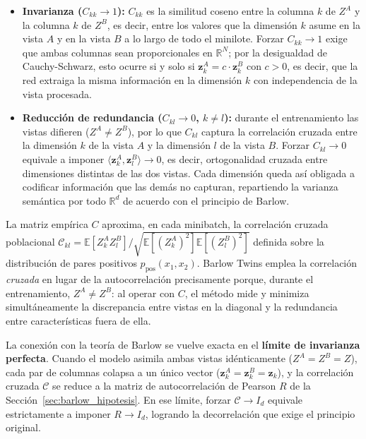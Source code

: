 \begin{itemize}
    \item \textbf{Invarianza ($C_{kk} \to 1$):} $C_{kk}$ es la similitud coseno entre la columna $k$ de $Z^A$ y la columna $k$ de $Z^B$, es decir, entre los valores que la dimensión $k$ asume en la vista $A$ y en la vista $B$ a lo largo de todo el minilote. Forzar $C_{kk} \to 1$ exige que ambas columnas sean proporcionales en $\mathbb{R}^N$; por la desigualdad de Cauchy-Schwarz, esto ocurre si y solo si $\mathbf{z}_k^A = c \cdot \mathbf{z}_k^B$ con $c > 0$, es decir, que la red extraiga la misma información en la dimensión $k$ con independencia de la vista procesada.

    \item \textbf{Reducción de redundancia ($C_{kl} \to 0$, $k \neq l$):} durante el entrenamiento las vistas difieren ($Z^A \neq Z^B$), por lo que $C_{kl}$ captura la correlación cruzada entre la dimensión $k$ de la vista $A$ y la dimensión $l$ de la vista $B$. Forzar $C_{kl} \to 0$ equivale a imponer $\langle \mathbf{z}_k^A, \mathbf{z}_l^B \rangle \to 0$, es decir, ortogonalidad cruzada entre dimensiones distintas de las dos vistas. Cada dimensión queda así obligada a codificar información que las demás no capturan, repartiendo la varianza semántica por todo $\mathbb{R}^d$ de acuerdo con el principio de Barlow.
\end{itemize}

La matriz empírica $C$ aproxima, en cada minibatch, la correlación cruzada poblacional $\mathcal{C}_{kl} = \mathbb{E}[Z_k^A Z_l^B] / \sqrt{\mathbb{E}[(Z_k^A)^2]\mathbb{E}[(Z_l^B)^2]}$ definida sobre la distribución de pares positivos $p_{\text{pos}}(x_1,x_2)$. Barlow Twins emplea la correlación \textit{cruzada} en lugar de la autocorrelación precisamente porque, durante el entrenamiento, $Z^A \neq Z^B$: al operar con $C$, el método mide y minimiza simultáneamente la discrepancia entre vistas en la diagonal y la redundancia entre características fuera de ella.

La conexión con la teoría de Barlow se vuelve exacta en el \textbf{límite de invarianza perfecta}. Cuando el modelo asimila ambas vistas idénticamente ($Z^A = Z^B = Z$), cada par de columnas colapsa a un único vector ($\mathbf{z}_k^A = \mathbf{z}_k^B = \mathbf{z}_k$), y la correlación cruzada $\mathcal{C}$ se reduce a la matriz de autocorrelación de Pearson $R$ de la Sección~\ref{sec:barlow_hipotesis}. En ese límite, forzar $\mathcal{C} \to I_d$ equivale estrictamente a imponer $R \to I_d$, logrando la decorrelación que exige el principio original.


